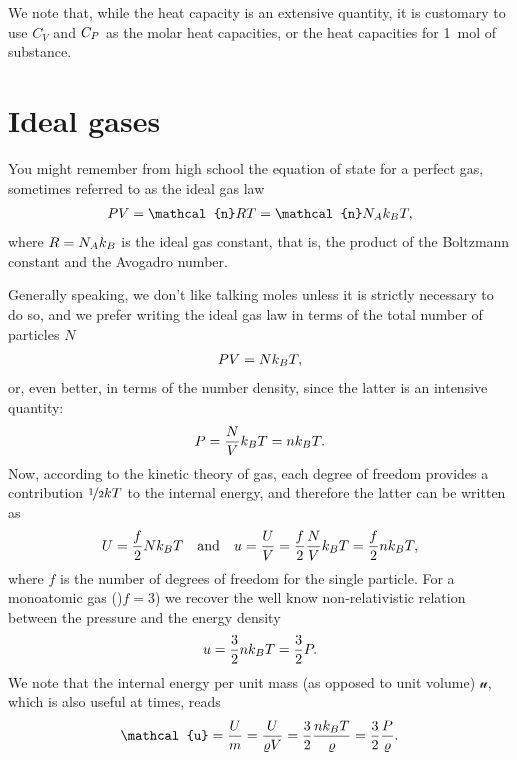 We note that, while the heat capacity is an extensive quantity, it is customary
to use $C_V$ and $C_{P}$ as the molar heat capacities, or the heat capacities
for  1~mol of substance.



\section{Ideal gases}

You might remember from high school the equation of state for a perfect gas, sometimes
referred to as the ideal gas law
\begin{align*}
  \pressure V = \mathcal{n} RT = \mathcal{n} N_A \kT,
\end{align*}
where $R = N_A k_B$ is the ideal gas constant, that is, the product of the Boltzmann
constant and the Avogadro number.

Generally speaking, we don't like talking moles unless it is strictly necessary
to do so, and we prefer writing the ideal gas law in terms of the total number of
particles $N$
\begin{align*}
  P V = N k_B T,
\end{align*}
or, even better, in terms of the number density, since the latter is an intensive
quantity:
\begin{align}
  P = \frac{N}{V} k_B T = nk_B T.
\end{align}
Now, according to the kinetic theory of gas, each degree of freedom provides
a contribution $\nicefrac{1}{2}kT$ to the internal energy, and therefore the latter
can be written as
\begin{align}\label{eq:ideal_gas_internal_energy}
  U = \frac{f}{2} N k_B T \quad\text{and}\quad
  u = \frac{U}{V} = \frac{f}{2} \frac{N}{V} k_B T = \frac{f}{2} n k_B T,
\end{align}
where $f$ is the number of degrees of freedom for the single particle. For a monoatomic
gas ()$f = 3$) we recover the well know non-relativistic relation between the pressure
and the energy density
\begin{align}
  u = \frac{3}{2} n k_B T = \frac{3}{2} P.
\end{align}
We note that the internal energy per unit mass (as opposed to unit volume) $\mathcal{u}$,
which is also useful at times, reads
\begin{align}
  \mathcal{u} = \frac{U}{m} = \frac{U}{\density V} =
  \frac{3}{2} \frac{n \kT}{\density} = \frac{3}{2} \frac{\pressure}{\density}.
\end{align}

